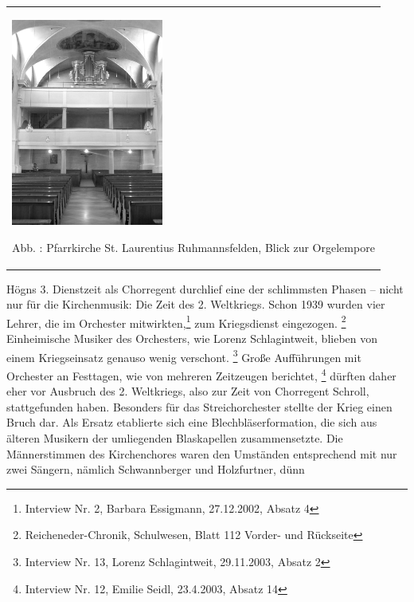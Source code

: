 \begin{center}
\begin{minipage}{5.593cm}
\begin{flushleft}
\tablefirsthead{}
\tablehead{}
\tabletail{}
\tablelasttail{}
\begin{supertabular}{m{5.393cm}}

\includegraphics[width=5.001cm,height=6.805cm]{pictures/zulassungsarbeit-img037.jpg}

Abb. : Pfarrkirche St. Laurentius
Ruhmannsfelden, Blick zur Orgelempore\\
\end{supertabular}
\end{flushleft}
\end{minipage}
\end{center}
Högns 3. Dienstzeit als Chorregent durchlief eine der schlimmsten Phasen
– nicht nur für die Kirchenmusik: Die Zeit des 2. Weltkriegs. Schon
1939 wurden vier Lehrer, die im Orchester mitwirkten,\footnote{
Interview Nr. 2, Barbara Essigmann, 27.12.2002, Absatz 4} zum
Kriegsdienst eingezogen. \footnote{Reicheneder-Chronik, Schulwesen,
Blatt 112 Vorder- und Rückseite} Einheimische Musiker des Orchesters,
wie Lorenz Schlagintweit, blieben von einem Kriegseinsatz genauso wenig
verschont. \footnote{Interview Nr. 13, Lorenz Schlagintweit,
29.11.2003, Absatz 2} Große Aufführungen mit Orchester an Festtagen,
wie von mehreren Zeitzeugen berichtet, \footnote{Interview Nr. 12,
Emilie Seidl, 23.4.2003, Absatz 14} dürften daher eher vor Ausbruch des
2. Weltkriegs, also zur Zeit von Chorregent Schroll, stattgefunden
haben. Besonders für das Streichorchester stellte der Krieg einen Bruch
dar. Als Ersatz etablierte sich eine Blechbläserformation, die sich aus
älteren Musikern der umliegenden Blaskapellen zusammensetzte. Die
Männerstimmen des Kirchenchores waren den Umständen entsprechend mit
nur zwei Sängern, nämlich Schwannberger und Holzfurtner, dünn
